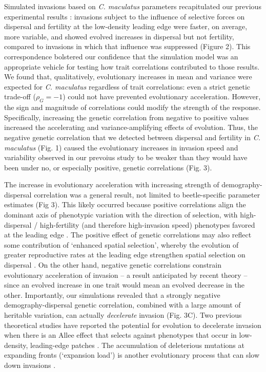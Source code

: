 \documentclass[11pt]{article}
\begin{document}
Simulated invasions based on \textit{C. maculatus} parameters recapitulated our previous experimental results \citep{ochocki_rapid_2017}: invasions subject to the influence of selective forces on dispersal and fertility at the low-density leading edge were faster, on average, more variable, and showed evolved increases in dispersal but not fertility, compared to invasions in which that influence was suppressed (Figure 2).
This correspondence bolstered our confidence that the simulation model was an appropriate vehicle for testing how trait correlations contributed to those results.
We found that, qualitatively, evolutionary increases in mean and variance were expected for \textit{C. maculatus} regardless of trait correlations: even a strict genetic trade-off ($\rho_{G} = -1$) could not have prevented evolutionary acceleration.
However, the sign and magnitude of correlations could modify the strength of the response.
Specifically, increasing the genetic correlation from negative to positive values increased the accelerating and variance-amplifying effects of evolution.
Thus, the negative genetic correlation that we detected between dispersal and fertility in \textit{C. maculatus} (Fig. 1) caused the evolutionary increases in invasion speed and variability observed in our prevoius study to be weaker than they would have been under no, or especially positive, genetic correlations (Fig. 3).

The increase in evolutionary acceleration with increasing strength of demography-dispersal correlation was a general result, not limited to beetle-specific parameter estimates (Fig 3).
This likely occurred because positive correlations align the dominant axis of phenotypic variation with the direction of selection, with high-dispersal / high-fertility (and therefore high-invasion speed) phenotypes favored at the leading edge \citep{phillips_life-history_2010}.
The positive effect of genetic correlations may also reflect some contribution of `enhanced spatial selection', whereby the evolution of greater reproductive rates at the leading edge strengthen spatial selection on dispersal \citep{perkins_evolution_2013}.
On the other hand, negative genetic correlations constrain evolutionary acceleration of invasion -- a result anticipated by recent theory \citep{phillips2018spatial} -- since an evolved increase in one trait would mean an evolved decrease in the other.
Importantly, our simulations revealed that a strongly negative demography-dispersal genetic correlation, combined with a large amount of heritable variation, can actually \textit{decelerate} invasion (Fig. 3C).
Two previous theoretical studies have reported the potential for evolution to decelerate invasion when there is an Allee effect that selects against phenotypes that occur in low-density, leading-edge patches \citep{shaw_dispersal_2015, travis_dispersal_2002}.
The accumulation of deleterious mutations at expanding fronts (`expansion load') is another evolutionary process that can slow down invasions \citep{gilbert2017local,peischl2018evolution}.
\end{document}
